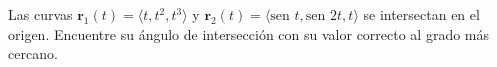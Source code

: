 \item Las curvas $\mathbf{r}_1(t) = \langle t, t^2, t^3 \rangle$ y $\mathbf{r}_2(t) = \langle \text{sen } t, \text{sen } 2t, t \rangle$ se intersectan en el origen. Encuentre su ángulo de intersección con su valor correcto al grado más cercano.
